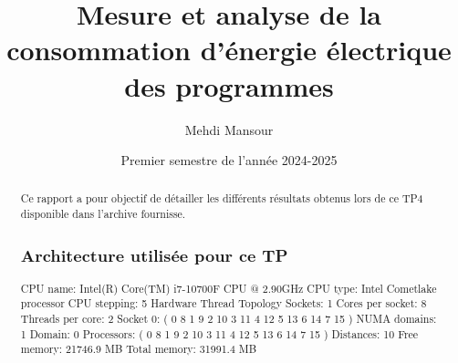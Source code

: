 \documentclass{rapport}
\title{Mesure et analyse de la consommation d’énergie électrique des
programmes}
\author{Mehdi Mansour}
\date{Premier semestre de l'année 2024-2025}
\begin{document}
  \maketitle

  \begin{abstract}
    Ce rapport a pour objectif de détailler les différents résultats obtenus lors de ce TP4 disponible dans l'archive fournisse.
\subsection*{Architecture utilisée pour ce TP}
     \noindent
    CPU name:	Intel(R) Core(TM) i7-10700F CPU @ 2.90GHz
    \newline
    CPU type:	Intel Cometlake processor
    \newline
    CPU stepping:	5
    \newline
    \newline
    \noindent
    Hardware Thread Topology
    \newline
    \newline
    Sockets:		1
    \newline
    Cores per socket:	8
    \newline
    Threads per core:	2
    \newline
    Socket 0:		( 0 8 1 9 2 10 3 11 4 12 5 13 6 14 7 15 )
    \newline
    \newline
    NUMA domains:		1
    \newline
    Domain:			0
    \newline
    Processors:		( 0 8 1 9 2 10 3 11 4 12 5 13 6 14 7 15 )
    \newline
    Distances:		10
    \newline
    Free memory:		21746.9 MB
    \newline
    Total memory:		31991.4 MB
    \newline


\end{abstract}
\end{document}
